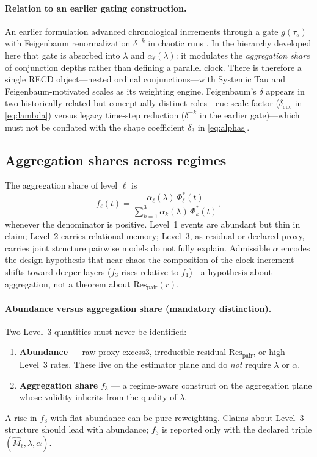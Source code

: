 \documentclass[11pt,a4paper]{article}
\begin{document}
\paragraph{Relation to an earlier gating construction.}
An earlier formulation advanced chronological increments through a gate
$g(\tau_s)$ with Feigenbaum renormalization $\delta^{-k}$ in chaotic
runs \cite{Padilla2026synthesis}. In the hierarchy developed here that
gate is absorbed into $\lambda$ and $\alpha_\ell(\lambda)$: it modulates
the \emph{aggregation share} of conjunction depths rather than defining a
parallel clock. There is therefore a single RECD object---nested ordinal
conjunctions---with Systemic Tau and Feigenbaum-motivated scales as its
weighting engine. Feigenbaum's $\delta$ appears in two historically
related but conceptually distinct roles---cue scale factor
($\delta_{\mathrm{cue}}$ in \eqref{eq:lambda}) versus legacy time-step
reduction ($\delta^{-k}$ in the earlier gate)---which must not be
conflated with the shape coefficient $\delta_3$ in \eqref{eq:alphas}.

\subsection{Aggregation shares across regimes}
\label{sec:shares}

The aggregation share of level $\ell$ is
\begin{equation}
\label{eq:frac}
f_\ell(t)
=\frac{\alpha_\ell(\lambda)\,\Phi_\ell^{\ast}(t)}
{\sum_{k=1}^{3}\alpha_k(\lambda)\,\Phi_k^{\ast}(t)},
\end{equation}
whenever the denominator is positive. Level~1 events are abundant but
thin in claim; Level~2 carries relational memory; Level~3, as residual or
declared proxy, carries joint structure pairwise models do not fully
explain. Admissible $\alpha$ encodes the design hypothesis that near
chaos the composition of the clock increment shifts toward deeper layers
($f_3$ rises relative to $f_1$)---a hypothesis about aggregation, not a
theorem about $\mathrm{Res}_{\mathrm{pair}}(r)$.

\paragraph{Abundance versus aggregation share (mandatory distinction).}
Two Level~3 quantities must never be identified:
\begin{enumerate}[leftmargin=*,itemsep=2pt]
  \item \textbf{Abundance} --- raw proxy excess3, irreducible residual
  $\mathrm{Res}_{\mathrm{pair}}$, or high-Level~3 rates. These live on
  the estimator plane and do \emph{not} require $\lambda$ or $\alpha$.
  \item \textbf{Aggregation share} $f_3$ --- a regime-aware construct on
  the aggregation plane whose validity inherits from the quality of
  $\lambda$.
\end{enumerate}
A rise in $f_3$ with flat abundance can be pure reweighting. Claims about
Level~3 structure should lead with abundance; $f_3$ is reported only with
the declared triple $(\widehat{M}_\ell,\lambda,\alpha)$.
\end{document}
